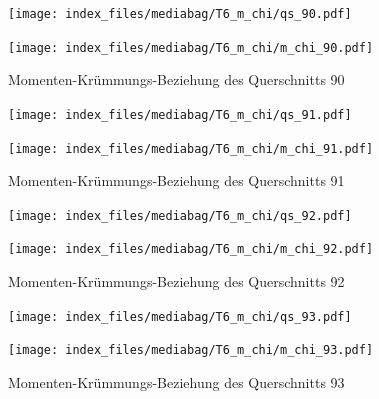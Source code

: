 \documentclass[
  11pt,
  letterpaper,
]{scrreprt}
\begin{document}
\begin{figure}[H]

\begin{minipage}{0.50\linewidth}
\texttt{[image: index\_files/mediabag/T6\_m\_chi/qs\_90.pdf]}\end{minipage}%
%
\begin{minipage}{0.50\linewidth}
\texttt{[image: index\_files/mediabag/T6\_m\_chi/m\_chi\_90.pdf]}\end{minipage}%

\caption{\label{fig-mchi_anhang}Momenten-Krümmungs-Beziehung des
Querschnitts 90}

\end{figure}%

\begin{figure}[H]

\begin{minipage}{0.50\linewidth}
\texttt{[image: index\_files/mediabag/T6\_m\_chi/qs\_91.pdf]}\end{minipage}%
%
\begin{minipage}{0.50\linewidth}
\texttt{[image: index\_files/mediabag/T6\_m\_chi/m\_chi\_91.pdf]}\end{minipage}%

\caption{\label{fig-mchi_anhang}Momenten-Krümmungs-Beziehung des
Querschnitts 91}

\end{figure}%

\begin{figure}[H]

\begin{minipage}{0.50\linewidth}
\texttt{[image: index\_files/mediabag/T6\_m\_chi/qs\_92.pdf]}\end{minipage}%
%
\begin{minipage}{0.50\linewidth}
\texttt{[image: index\_files/mediabag/T6\_m\_chi/m\_chi\_92.pdf]}\end{minipage}%

\caption{\label{fig-mchi_anhang}Momenten-Krümmungs-Beziehung des
Querschnitts 92}

\end{figure}%

\begin{figure}[H]

\begin{minipage}{0.50\linewidth}
\texttt{[image: index\_files/mediabag/T6\_m\_chi/qs\_93.pdf]}\end{minipage}%
%
\begin{minipage}{0.50\linewidth}
\texttt{[image: index\_files/mediabag/T6\_m\_chi/m\_chi\_93.pdf]}\end{minipage}%

\caption{\label{fig-mchi_anhang}Momenten-Krümmungs-Beziehung des
Querschnitts 93}

\end{figure}%
\end{document}
